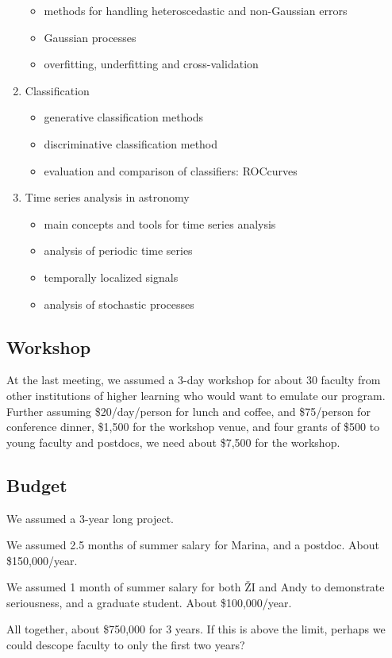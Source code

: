 \begin{enumerate}
\begin{itemize}
\item  methods for handling heteroscedastic and non-Gaussian errors 
\item  Gaussian processes
\item  overfitting, underfitting and cross-validation
\end{itemize} 
\item Classification 
\begin{itemize}
\item  generative classification methods
\item  discriminative classification method 
\item  evaluation and comparison of classifiers: ROCcurves 
\end{itemize} 
\item Time series analysis in astronomy
\begin{itemize}
\item  main concepts and tools for time series analysis
\item  analysis of periodic time series 
\item  temporally localized signals
\item  analysis of stochastic processes
\end{itemize} 
\end{enumerate} 






\subsection{Workshop} 


At the last meeting, we assumed a 3-day workshop for about 30 faculty from other institutions
of higher learning who would want to emulate our program. Further assuming \$20/day/person
for lunch and coffee, and \$75/person for conference dinner, \$1,500 for the workshop venue,
and four grants of \$500 to young faculty and postdocs, we need about \$7,500 for the workshop. 



\subsection{Budget} 

We assumed a 3-year long project. 

We assumed 2.5 months of summer salary for Marina, and a postdoc. About \$150,000/year. 

We assumed 1 month of summer salary for both \v{Z}I and Andy to demonstrate seriousness,
and a graduate student. About \$100,000/year. 

All together, about \$750,000 for 3 years. If this is above the limit, perhaps we could 
descope faculty to only the first two years? 



